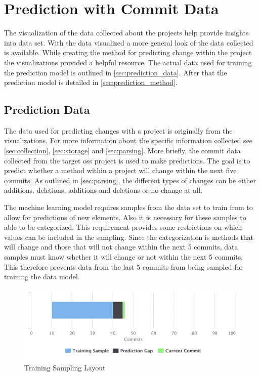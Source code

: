 \chapter{Prediction with Commit Data}
\label{chap:prediction}


The visualization of the data collected about the projects help provide insights into data set. With the data visualized a more general look of the data collected is available. While creating the method for predicting change within the project the visualizations provided a helpful resource. The actual data used for training the prediction model is outlined in \autoref{sec:prediction_data}. After that the prediction model is detailed in \autoref{sec:prediction_method}. %

\section{Prediction Data}
\label{sec:prediction_data}



The data used for predicting changes with a project is originally from the visualizations. For more information about the specific information collected see  \autoref{sec:collection}, \autoref{sec:storage} and \autoref{sec:parsing}. More briefly, the commit data collected from the target \gls{oss} project is used to make predictions. The goal is to predict whether a method within a project will change within the next five commits. As outlined in \autoref{sec:parsing}, the different types of changes can be either additions, deletions, additions and deletions or no change at all.

The machine learning model requires samples from the data set to train from to allow for predictions of new elements. Also it is necessary for these samples to able to be categorized. This requirement provides some restrictions on which values can be included in the sampling. Since the categorization is methods that will change and those that will not change within the next 5 commits, data samples must know whether it will change or not within the next 5 commits. This therefore prevents data from the last 5 commits from being sampled for training the data model.

\begin{figure}[!ht]
    \centering
        \includegraphics[width=1.0\textwidth]{images/training_sampling}
    \caption{Training Sampling Layout}
    \label{fig:training_data_range}
\end{figure}

